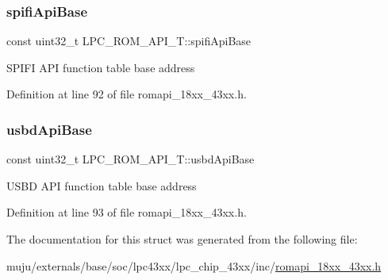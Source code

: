 \subsubsection{\texorpdfstring{spifi\+Api\+Base}{spifiApiBase}}
{\footnotesize\ttfamily const uint32\+\_\+t L\+P\+C\+\_\+\+R\+O\+M\+\_\+\+A\+P\+I\+\_\+\+T\+::spifi\+Api\+Base}

S\+P\+I\+FI A\+PI function table base address 

Definition at line 92 of file romapi\+\_\+18xx\+\_\+43xx.\+h.

\mbox{\label{struct_l_p_c___r_o_m___a_p_i___t_a94bc8146ba697eeadc992d4985971550}} 
\subsubsection{\texorpdfstring{usbd\+Api\+Base}{usbdApiBase}}
{\footnotesize\ttfamily const uint32\+\_\+t L\+P\+C\+\_\+\+R\+O\+M\+\_\+\+A\+P\+I\+\_\+\+T\+::usbd\+Api\+Base}

U\+S\+BD A\+PI function table base address 

Definition at line 93 of file romapi\+\_\+18xx\+\_\+43xx.\+h.



The documentation for this struct was generated from the following file\+:\begin{DoxyCompactItemize}
\item 
muju/externals/base/soc/lpc43xx/lpc\+\_\+chip\+\_\+43xx/inc/\hyperlink{romapi__18xx__43xx_8h}{romapi\+\_\+18xx\+\_\+43xx.\+h}\end{DoxyCompactItemize}
